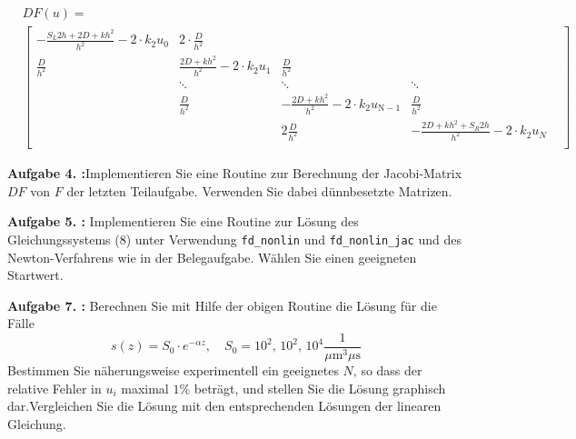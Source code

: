 \begin{align}
	 & DF(u)\mathrm=                                                  \\
	 & \begin{bmatrix}
		   -	\frac{S_L2h+2D+kh^2}{h^2}-2\cdot k_2u_0 &
		   2\cdot \frac{D}{h^2}                     &                                                                              \\
		   \frac{D}{h^2}                            & \frac{2D+kh^2}{h^2}-2\cdot k_2
		   u_\mathrm{1}                             & \frac{D}{h^2}                                                                \\
		                                            & \ddots                         & \ddots                           & \ddots & \\
		                                            & \frac{D}{h^2}                  & - \frac{2D+kh^2}{h^2}-2\cdot k_2
		   u_\mathrm{N-1}                           & \frac{D}{h^2}                                                                \\
		                                            &                                & 2\frac{D}{h^2}                   &
		   -\frac{2D+kh^2+S_R2h}{h^2}-2\cdot k_2u_N                                                                                \\
	   \end{bmatrix}
\end{align}

\begin{mybox}
	\textbf{Aufgabe 4. :}Implementieren Sie eine Routine zur Berechnung der
	Jacobi-Matrix $DF$ von $F$ der letzten Teilaufgabe.
	Verwenden Sie dabei dünnbesetzte Matrizen.
\end{mybox}



\begin{mybox}
	\textbf{Aufgabe 5. :}
	Implementieren Sie eine Routine zur Lösung des Gleichungssystems (8)
	unter Verwendung \verb*|fd_nonlin|
	und \verb*|fd_nonlin_jac| und des Newton-Verfahrens wie in der
	Belegaufgabe. Wählen Sie einen geeigneten
	Startwert.
\end{mybox}


\begin{mybox}
	\textbf{Aufgabe 7. :}	Berechnen Sie mit Hilfe der obigen Routine die
	Lösung für die Fälle
	\begin{equation}
		s(z)=S_0\cdot e^{-\alpha z}, \quad S_0=10^2, \, 10^2, \, 10^4
		\frac{1}{\si{\mu\meter^3 \mu \s}}
	\end{equation}
	Bestimmen Sie näherungsweise experimentell ein geeignetes $N$, so dass
	der relative Fehler in $u_i$
	maximal $1\%$ beträgt, und stellen Sie die Lösung graphisch
	dar.Vergleichen Sie die Lösung mit den
	entsprechenden Lösungen der linearen Gleichung.
\end{mybox}